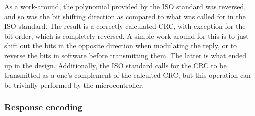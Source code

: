 As a work-around, the polynomial provided by the ISO standard was reversed, and so was the bit shifting
direction as compared to what was called for in the ISO standard. The result is a correctly calculated
CRC, with exception for the bit order, which is completely reversed. A simple work-around for this is to
just shift out the bits in the opposite direction when modulating the reply, or to reverse the bits
in software before transmitting them. The latter is what ended up in the design. Additionally, the ISO standard
calls for the CRC to be transmitted as a one's complement of the calculted CRC, but this operation
can be trivially performed by the microcontroller.


\subsubsection{Response encoding}
